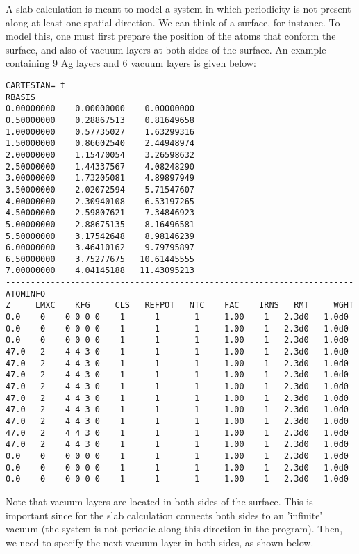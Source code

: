 \documentclass[11pt,fleqn]{book} %
\begin{document}
A slab calculation is meant to model a system in which periodicity is not
present along at least one spatial direction. We can think of a surface, for instance.
To model this, one must first prepare the position of the atoms that conform the surface,
and also of vacuum layers at both sides of the surface. An example containing
9 Ag layers and 6 vacuum layers is given below:
\begin{VBox}
\begin{verbatim}
CARTESIAN= t
RBASIS
0.00000000    0.00000000    0.00000000
0.50000000    0.28867513    0.81649658
1.00000000    0.57735027    1.63299316
1.50000000    0.86602540    2.44948974
2.00000000    1.15470054    3.26598632
2.50000000    1.44337567    4.08248290
3.00000000    1.73205081    4.89897949
3.50000000    2.02072594    5.71547607
4.00000000    2.30940108    6.53197265
4.50000000    2.59807621    7.34846923
5.00000000    2.88675135    8.16496581
5.50000000    3.17542648    8.98146239
6.00000000    3.46410162    9.79795897
6.50000000    3.75277675   10.61445555
7.00000000    4.04145188   11.43095213
----------------------------------------------------------------------
ATOMINFO
Z     LMXC    KFG     CLS   REFPOT   NTC    FAC    IRNS   RMT     WGHT
0.0    0    0 0 0 0    1      1       1     1.00    1   2.3d0   1.0d0
0.0    0    0 0 0 0    1      1       1     1.00    1   2.3d0   1.0d0
0.0    0    0 0 0 0    1      1       1     1.00    1   2.3d0   1.0d0
47.0   2    4 4 3 0    1      1       1     1.00    1   2.3d0   1.0d0
47.0   2    4 4 3 0    1      1       1     1.00    1   2.3d0   1.0d0
47.0   2    4 4 3 0    1      1       1     1.00    1   2.3d0   1.0d0
47.0   2    4 4 3 0    1      1       1     1.00    1   2.3d0   1.0d0
47.0   2    4 4 3 0    1      1       1     1.00    1   2.3d0   1.0d0
47.0   2    4 4 3 0    1      1       1     1.00    1   2.3d0   1.0d0
47.0   2    4 4 3 0    1      1       1     1.00    1   2.3d0   1.0d0
47.0   2    4 4 3 0    1      1       1     1.00    1   2.3d0   1.0d0
47.0   2    4 4 3 0    1      1       1     1.00    1   2.3d0   1.0d0
0.0    0    0 0 0 0    1      1       1     1.00    1   2.3d0   1.0d0
0.0    0    0 0 0 0    1      1       1     1.00    1   2.3d0   1.0d0
0.0    0    0 0 0 0    1      1       1     1.00    1   2.3d0   1.0d0
\end{verbatim}
\end{VBox}
Note that vacuum layers are located in both sides of the surface.
This is important since for the slab calculation
connects both sides to an 'infinite' vacuum (the system is not
periodic along this direction in the program). Then,
we need to specify the next vacuum layer in both
sides, as shown below.
\end{document}
